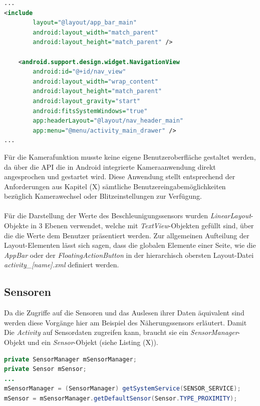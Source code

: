 \begin{lstlisting}[caption=Layout des Hauptmenüs in der Datei \textit{activity\_main.xml}, label=lst:MainMenu, language=XML]
...
<include
        layout="@layout/app_bar_main"
        android:layout_width="match_parent"
        android:layout_height="match_parent" />

    <android.support.design.widget.NavigationView
        android:id="@+id/nav_view"
        android:layout_width="wrap_content"
        android:layout_height="match_parent"
        android:layout_gravity="start"
        android:fitsSystemWindows="true"
        app:headerLayout="@layout/nav_header_main"
        app:menu="@menu/activity_main_drawer" />
...
\end{lstlisting} 

Für die Kamerafunktion musste keine eigene Benutzeroberfläche gestaltet werden, da über die API die in Android integrierte Kameraanwendung direkt angesprochen und gestartet wird. Diese Anwendung stellt entsprechend der Anforderungen aus Kapitel (X) sämtliche Benutzereingabemöglichkeiten bezüglich Kamerawechsel oder Blitzeinstellungen zur Verfügung. 
\\
\\
Für die Darstellung der Werte des Beschleunigungssensors wurden \textit{LinearLayout}-Objekte in 3 Ebenen verwendet, welche mit \textit{TextView}-Objekten gefüllt sind, über die die Werte dem Benutzer präsentiert werden. Zur allgemeinen Aufteilung der Layout-Elementen lässt sich sagen, dass die globalen Elemente einer Seite, wie die \textit{AppBar} oder der \textit{FloatingActionButton} in der hierarchisch obersten Layout-Datei \textit{activity\_[name].xml} definiert werden.

\subsection{Sensoren}

Da die Zugriffe auf die Sensoren und das Auslesen ihrer Daten äquivalent sind werden diese Vorgänge hier am Beispiel des Näherungssensors erläutert. Damit Die \textit{Activity} auf Sensordaten zugreifen kann, braucht sie ein \textit{SensorManager}-Objekt und ein \textit{Sensor}-Objekt (siehe Listing (X)).

\begin{lstlisting}[caption=Definition und Initialisierung von Sensor und SensorManager, label=lst:SensorInit, language=Java]
private SensorManager mSensorManager;
private Sensor mSensor;
...
mSensorManager = (SensorManager) getSystemService(SENSOR_SERVICE);
mSensor = mSensorManager.getDefaultSensor(Sensor.TYPE_PROXIMITY);
\end{lstlisting} 

